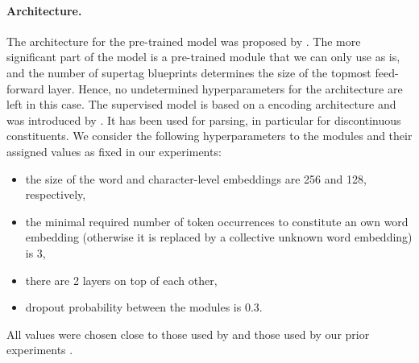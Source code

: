 \documentclass[../../document.tex]{subfiles}
\begin{document}
    \paragraph*{Architecture.}
    The architecture for the pre-trained model was proposed by \citet{Devlin2019}.
    The more significant part of the model is a pre-trained module that we can only use as is, and the number of supertag blueprints determines the size of the topmost feed-forward layer.
    Hence, no undetermined hyperparameters for the architecture are left in this case.
    The  supervised model is based on a  encoding architecture and was introduced by \citet{kiperwasser2016simple}.
    It has been used for parsing, in particular for discontinuous constituents. \citep{kiperwasser2016simple,CoaCoh19,StaSte20,Cor20}
    We consider the following hyperparameters to the modules and their assigned values as fixed in our experiments:
    \begin{itemize}
        \item the size of the word and character-level embeddings are 256 and 128, respectively,
        \item the minimal required number of token occurrences to constitute an own word embedding (otherwise it is replaced by a collective unknown word embedding) is 3,
        \item there are 2  layers on top of each other,
        \item dropout probability between the modules is 0.3.
    \end{itemize}
    All values were chosen close to those used by \citet{Cor20} and those used by our prior experiments \citep{Rup22}.
\end{document}
